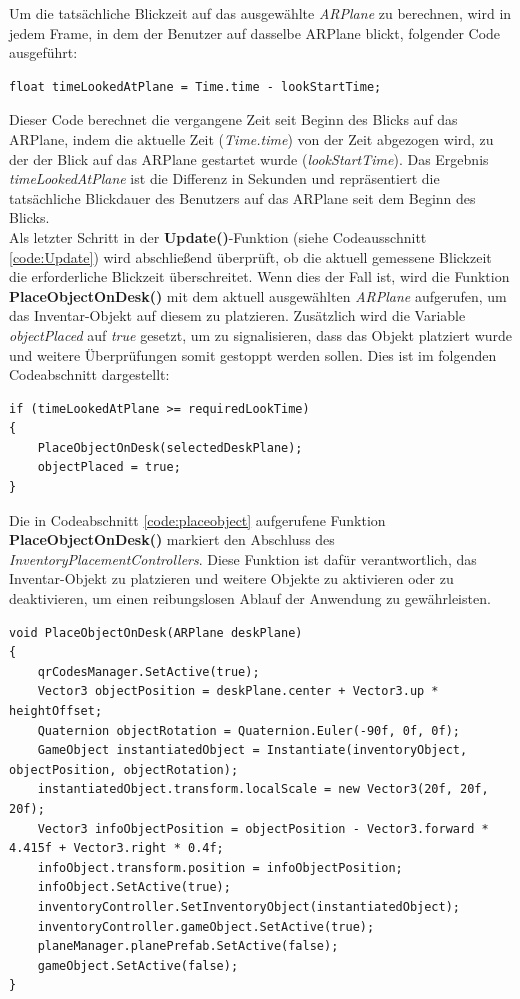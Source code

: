 Um die tatsächliche Blickzeit auf das ausgewählte \textit{ARPlane} zu berechnen, wird in jedem Frame, in dem der Benutzer
auf dasselbe ARPlane blickt, folgender Code ausgeführt:
\begin{lstlisting}[style=csharp, caption={Blickzeit messen}, label=code:TimeUpdate]
float timeLookedAtPlane = Time.time - lookStartTime;
\end{lstlisting}

Dieser Code berechnet die vergangene Zeit seit Beginn des Blicks auf das ARPlane, indem die aktuelle Zeit (\textit{Time.time})
von der Zeit abgezogen wird, zu der der Blick auf das ARPlane gestartet wurde (\textit{lookStartTime}). Das Ergebnis \textit{timeLookedAtPlane}
ist die Differenz in Sekunden und repräsentiert die tatsächliche Blickdauer des Benutzers auf das ARPlane seit dem Beginn des Blicks.\\

Als letzter Schritt in der \textbf{Update()}-Funktion (siehe Codeausschnitt \ref{code:Update}) wird abschließend überprüft,
ob die aktuell gemessene Blickzeit die erforderliche Blickzeit überschreitet. Wenn dies der Fall ist, wird die Funktion
\textbf{PlaceObjectOnDesk()} mit dem aktuell ausgewählten \textit{ARPlane} aufgerufen, um das Inventar-Objekt auf diesem
zu platzieren. Zusätzlich wird die Variable \textit{objectPlaced} auf \textit{true} gesetzt, um zu signalisieren, dass das
Objekt platziert wurde und weitere Überprüfungen somit gestoppt werden sollen. Dies ist im folgenden Codeabschnitt dargestellt:
\begin{lstlisting}[style=csharp, caption={Platzierungsfunktion aufrufen}, label=code:Placement]
if (timeLookedAtPlane >= requiredLookTime)
{
    PlaceObjectOnDesk(selectedDeskPlane);
    objectPlaced = true;
}
\end{lstlisting}


Die in Codeabschnitt \ref{code:placeobject} aufgerufene Funktion \textbf{PlaceObjectOnDesk()} markiert den Abschluss des
\textit{InventoryPlacementControllers}. Diese Funktion ist dafür verantwortlich, das Inventar-Objekt zu platzieren und
weitere Objekte zu aktivieren oder zu deaktivieren, um einen reibungslosen Ablauf der Anwendung zu gewährleisten.

\begin{lstlisting}[style=csharp, caption={Inventar platzier - Funktion}, label=code:placeobject]
void PlaceObjectOnDesk(ARPlane deskPlane)
{
    qrCodesManager.SetActive(true);
    Vector3 objectPosition = deskPlane.center + Vector3.up * heightOffset;
    Quaternion objectRotation = Quaternion.Euler(-90f, 0f, 0f);
    GameObject instantiatedObject = Instantiate(inventoryObject, objectPosition, objectRotation);
    instantiatedObject.transform.localScale = new Vector3(20f, 20f, 20f);
    Vector3 infoObjectPosition = objectPosition - Vector3.forward * 4.415f + Vector3.right * 0.4f;
    infoObject.transform.position = infoObjectPosition;
    infoObject.SetActive(true);
    inventoryController.SetInventoryObject(instantiatedObject);
    inventoryController.gameObject.SetActive(true);
    planeManager.planePrefab.SetActive(false);
    gameObject.SetActive(false);
}
\end{lstlisting}

